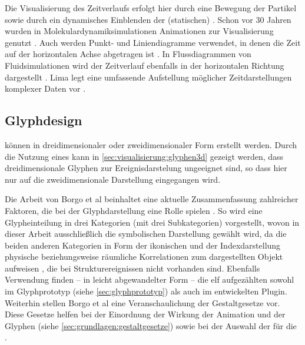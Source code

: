 Die Visualisierung des Zeitverlaufs erfolgt hier durch eine Bewegung der Partikel sowie durch ein dynamisches Einblenden der (statischen) . Schon vor 30 Jahren wurden in Molekulardynamiksimulationen Animationen zur Visualisierung genutzt \cite{delhaise1984computerAnimation}. Auch werden Punkt- und Liniendiagramme verwendet, in denen die Zeit auf der horizontalen Achse abgetragen ist \cite{nerukh2008temporalPatternsMD}. In Flussdiagrammen von Fluidsimulationen wird der Zeitverlauf ebenfalls in der horizontalen Richtung dargestellt \cite{laney2006turbulentMixingLayer}. Lima legt eine umfassende Aufstellung möglicher Zeitdarstellungen komplexer Daten vor \cite{lima2013visualComplexity}.


\subsection*{Glyphdesign}\label{sec:related:glyphdesign}

 können in dreidimensionaler oder zweidimensionaler Form erstellt werden. Durch die Nutzung eines  kann in \autoref{sec:visualisierung:glyphen3d} gezeigt werden, dass dreidimensionale Glyphen zur Ereignisdarstelung ungeeignet sind, so dass hier nur auf die zweidimensionale Darstellung eingegangen wird.

Die Arbeit von Borgo et al beinhaltet eine aktuelle Zusammenfassung zahlreicher Faktoren, die bei der Glyphdarstellung eine Rolle spielen \cite{borgo2013glyph}. So wird eine Glypheinteilung in drei Kategorien (mit drei Subkategorien) vorgestellt, wovon in dieser Arbeit ausschließlich die symbolischen Darstellung gewählt wird, da die beiden anderen Kategorien in Form der ikonischen und der Indexdarstellung physische beziehungsweise räumliche Korrelationen zum dargestellten Objekt aufweisen \cite[S.~3]{borgo2013glyph}, die bei Strukturereignissen nicht vorhanden sind. Ebenfalls Verwendung finden -- in leicht abgewandelter Form -- die elf aufgezählten  sowohl im Glyphprototyp (siehe \autoref{sec:glyphprototyp}) als auch im entwickelten Plugin. Weiterhin stellen Borgo et al eine Veranschaulichung der Gestaltgesetze vor. Diese Gesetze helfen bei der Einordnung der Wirkung der Animation und der Glyphen (siehe \autoref{sec:grundlagen:gestaltgesetze}) sowie bei der Auswahl der  für die .

